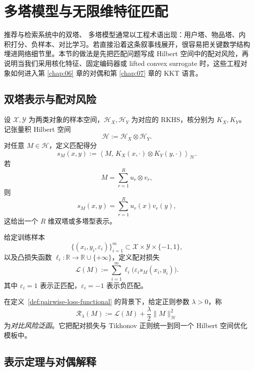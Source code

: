 \section{多塔模型与无限维特征匹配}

\label{sec:12-3}

推荐与检索系统中的双塔、 多塔模型通常以工程术语出现：用户塔、物品塔、内积打分、负样本、对比学习。若直接沿着这条叙事线展开，很容易把关键数学结构埋进网络细节里。本节的做法是先把匹配问题写成 Hilbert 空间中的配对风险，再说明当我们采用核化特征、固定编码器或 lifted convex surrogate 时，这些工程对象如何进入第 \ref{chap:06} 章的对偶和第 \ref{chap:07} 章的 KKT 语言。

\subsection{双塔表示与配对风险}

\begin{definition}[双塔嵌入模型]\label{def:two-tower-embedding-model}
设 $\mathcal X,\mathcal Y$ 为两类对象的样本空间，$\mathcal H_X,\mathcal H_Y$ 为对应的 RKHS，核分别为 $K_X,K_Y$。记张量积 Hilbert 空间
\[
\mathcal H:=\mathcal H_X\otimes \mathcal H_Y.
\]
对任意 $M\in \mathcal H$，定义匹配得分
\[
s_M(x,y)
:=
\left\langle
M,\,
K_X(x,\cdot)\otimes K_Y(y,\cdot)
\right\rangle_{\mathcal H}.
\]
若
\[
M=\sum_{r=1}^R u_r\otimes v_r,
\]
则
\[
s_M(x,y)=\sum_{r=1}^R u_r(x)v_r(y),
\]
这给出一个 $R$ 维双塔或多塔型表示。
\end{definition}

\begin{definition}[配对损失泛函]\label{def:pairwise-loss-functional}
给定训练样本
\[
\{(x_i,y_i,\varepsilon_i)\}_{i=1}^m\subset \mathcal X\times \mathcal Y\times \{-1,1\},
\]
以及凸损失函数 $\ell_i\colon \mathbb R\to \mathbb R\cup\{+\infty\}$，定义配对损失
\[
\mathcal L(M)
:=
\sum_{i=1}^m \ell_i\bigl(\varepsilon_i s_M(x_i,y_i)\bigr).
\]
其中 $\varepsilon_i=1$ 表示正匹配，$\varepsilon_i=-1$ 表示负匹配。
\end{definition}

\begin{definition}[对比风险泛函]\label{def:contrastive-risk-functional}
在定义~\ref{def:pairwise-loss-functional} 的背景下，给定正则参数 $\lambda>0$，称
\[
\mathcal R_\lambda(M)
:=
\mathcal L(M)+\frac{\lambda}{2}\|M\|_{\mathcal H}^2
\]
为\emph{对比风险泛函}。它把配对损失与 Tikhonov 正则统一到同一个 Hilbert 空间优化模板中。
\end{definition}

\subsection{表示定理与对偶解释}

